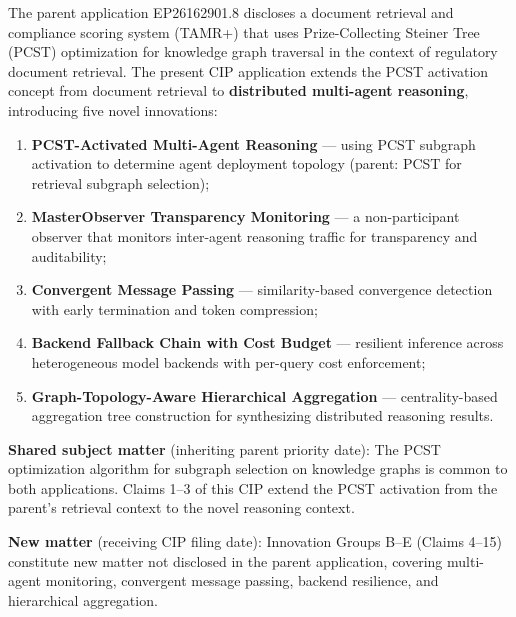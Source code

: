 \documentclass[a4paper,12pt]{article}
\begin{document}
\vspace{2mm}

\noindent The parent application EP26162901.8 discloses a document retrieval and compliance scoring system (TAMR+) that uses Prize-Collecting Steiner Tree (PCST) optimization for knowledge graph traversal in the context of regulatory document retrieval. The present CIP application extends the PCST activation concept from document retrieval to \textbf{distributed multi-agent reasoning}, introducing five novel innovations:

\begin{enumerate}[nosep,leftmargin=2em]
\item \textbf{PCST-Activated Multi-Agent Reasoning} --- using PCST subgraph activation to determine agent deployment topology (parent: PCST for retrieval subgraph selection);
\item \textbf{MasterObserver Transparency Monitoring} --- a non-participant observer that monitors inter-agent reasoning traffic for transparency and auditability;
\item \textbf{Convergent Message Passing} --- similarity-based convergence detection with early termination and token compression;
\item \textbf{Backend Fallback Chain with Cost Budget} --- resilient inference across heterogeneous model backends with per-query cost enforcement;
\item \textbf{Graph-Topology-Aware Hierarchical Aggregation} --- centrality-based aggregation tree construction for synthesizing distributed reasoning results.
\end{enumerate}

\vspace{2mm}

\noindent \textbf{Shared subject matter} (inheriting parent priority date): The PCST optimization algorithm for subgraph selection on knowledge graphs is common to both applications. Claims 1--3 of this CIP extend the PCST activation from the parent's retrieval context to the novel reasoning context.

\noindent \textbf{New matter} (receiving CIP filing date): Innovation Groups B--E (Claims 4--15) constitute new matter not disclosed in the parent application, covering multi-agent monitoring, convergent message passing, backend resilience, and hierarchical aggregation.

\vspace{4mm}

\end{document}
